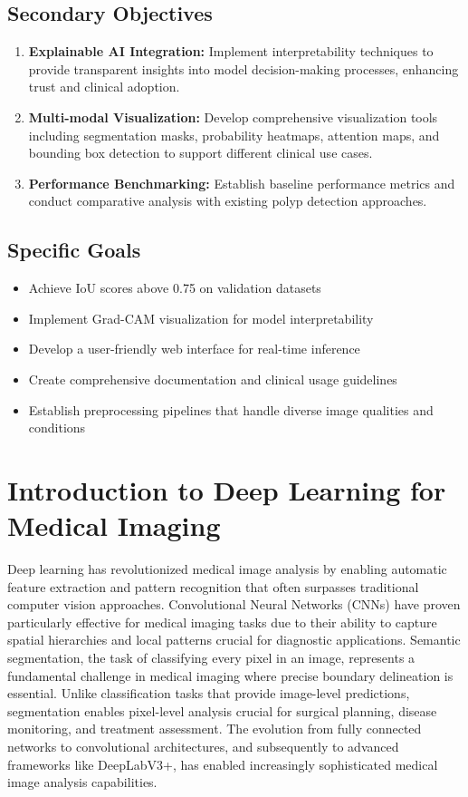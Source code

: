 \documentclass[a4paper,12pt]{report}
\begin{document}
    \subsection{Secondary Objectives}
\begin{enumerate}
    \item\textbf{Explainable AI Integration:}
     Implement interpretability techniques to provide transparent insights into model decision-making processes, enhancing trust and clinical adoption.
    \item\textbf{Multi-modal Visualization:}
       Develop comprehensive visualization tools including segmentation masks, probability heatmaps, attention maps, and bounding box detection to support different clinical use cases.
    \item\textbf{Performance Benchmarking:}
       Establish baseline performance metrics and conduct comparative analysis with existing polyp detection approaches.
 \end{enumerate}
    \subsection{Specific Goals}
    \begin{itemize}
    \item   Achieve IoU scores above 0.75 on validation datasets
    \item   Implement Grad-CAM visualization for model interpretability
    \item   Develop a user-friendly web interface for real-time inference
    \item   Create comprehensive documentation and clinical usage guidelines
    \item   Establish preprocessing pipelines that handle diverse image qualities and conditions
    \end{itemize}
    


    \section{Introduction to Deep Learning for Medical Imaging}
    Deep learning has revolutionized medical image analysis by enabling automatic feature extraction and pattern recognition that often surpasses traditional computer vision approaches. Convolutional Neural Networks (CNNs) have proven particularly effective for medical imaging tasks due to their ability to capture spatial hierarchies and local patterns crucial for diagnostic applications.
Semantic segmentation, the task of classifying every pixel in an image, represents a fundamental challenge in medical imaging where precise boundary delineation is essential. Unlike classification tasks that provide image-level predictions, segmentation enables pixel-level analysis crucial for surgical planning, disease monitoring, and treatment assessment.
The evolution from fully connected networks to convolutional architectures, and subsequently to advanced frameworks like DeepLabV3+, has enabled increasingly sophisticated medical image analysis capabilities. 
\end{document}
